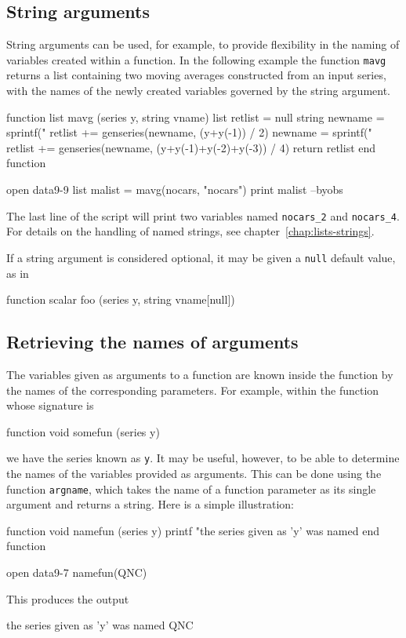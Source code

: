 \subsection{String arguments}

String arguments can be used, for example, to provide flexibility in
the naming of variables created within a function.  In the following
example the function \texttt{mavg} returns a list containing two
moving averages constructed from an input series, with the names of
the newly created variables governed by the string argument.
%
\begin{code}
function list mavg (series y, string vname)
   list retlist = null
   string newname = sprintf("%
   retlist += genseries(newname, (y+y(-1)) / 2)
   newname = sprintf("%
   retlist += genseries(newname, (y+y(-1)+y(-2)+y(-3)) / 4)
   return retlist
end function

open data9-9
list malist = mavg(nocars, "nocars")
print malist --byobs
\end{code}
%
The last line of the script will print two variables named
\verb|nocars_2| and \verb|nocars_4|.  For details on the handling of
named strings, see chapter~\ref{chap:lists-strings}.

If a string argument is considered optional, it may be given a
\texttt{null} default value, as in
%
\begin{code}
function scalar foo (series y, string vname[null])
\end{code}

\subsection{Retrieving the names of arguments}

The variables given as arguments to a function are known inside the
function by the names of the corresponding parameters.  For example,
within the function whose signature is
%
\begin{code}
function void somefun (series y)
\end{code}
%
we have the series known as \texttt{y}.  It may be useful, however, to
be able to determine the names of the variables provided as arguments.
This can be done using the function \texttt{argname}, which takes the
name of a function parameter as its single argument and returns a
string.  Here is a simple illustration:
%
\begin{code}
function void namefun (series y)
  printf "the series given as 'y' was named %
end function

open data9-7
namefun(QNC)
\end{code}
%
This produces the output
%
\begin{code}
the series given as 'y' was named QNC
\end{code}

